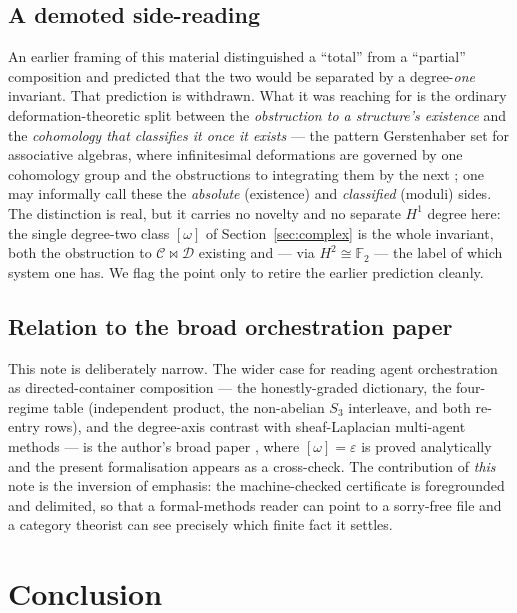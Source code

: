 \documentclass[11pt]{amsart}
\theoremstyle{definition}
\theoremstyle{remark}
\newcommand{\C}{\mathcal{C}}
\newcommand{\D}{\mathcal{D}}
\newcommand{\FF}{\mathbb{F}_2}
\begin{document}
\subsection*{A demoted side-reading}
An earlier framing of this material distinguished a ``total'' from a ``partial'' composition and
predicted that the two would be separated by a degree-\emph{one} invariant. That prediction is
withdrawn. What it was reaching for is the ordinary deformation-theoretic split between the
\emph{obstruction to a structure's existence} and the \emph{cohomology that classifies it once it
exists} --- the pattern Gerstenhaber set for associative algebras, where infinitesimal deformations
are governed by one cohomology group and the obstructions to integrating them by the next
\cite{gerstenhaber}; one may informally call these the \emph{absolute} (existence) and
\emph{classified} (moduli) sides. The distinction is real, but it carries no novelty and no separate
$H^1$ degree here: the single degree-two class $[\omega]$ of Section~\ref{sec:complex} is the whole
invariant, both the obstruction to $\C\bowtie\D$ existing and --- via $H^2\cong\FF$ --- the label of
which system one has. We flag the point only to retire the earlier prediction cleanly.

\subsection*{Relation to the broad orchestration paper}
This note is deliberately narrow. The wider case for reading agent orchestration as directed-container
composition --- the honestly-graded dictionary, the four-regime table (independent product, the
non-abelian $S_3$ interleave, and both re-entry rows), and the degree-axis contrast with sheaf-Laplacian
multi-agent methods --- is the author's broad paper \cite{orchestration}, where $[\omega]=\varepsilon$
is proved analytically and the present formalisation appears as a cross-check. The contribution of
\emph{this} note is the inversion of emphasis: the machine-checked certificate is foregrounded and
delimited, so that a formal-methods reader can point to a sorry-free file and a category theorist can
see precisely which finite fact it settles.

\section{Conclusion}\label{sec:concl}
\end{document}
